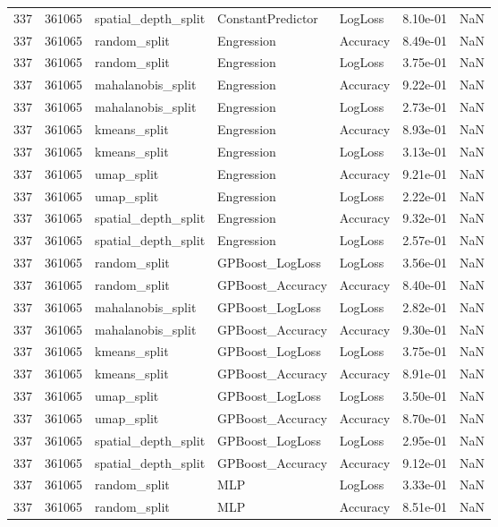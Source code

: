 \begin{tabular}{rrlllrr}
337 & 361065 & spatial\_depth\_split & ConstantPredictor & LogLoss & 8.10e-01 & NaN \\
337 & 361065 & random\_split & Engression & Accuracy & 8.49e-01 & NaN \\
337 & 361065 & random\_split & Engression & LogLoss & 3.75e-01 & NaN \\
337 & 361065 & mahalanobis\_split & Engression & Accuracy & 9.22e-01 & NaN \\
337 & 361065 & mahalanobis\_split & Engression & LogLoss & 2.73e-01 & NaN \\
337 & 361065 & kmeans\_split & Engression & Accuracy & 8.93e-01 & NaN \\
337 & 361065 & kmeans\_split & Engression & LogLoss & 3.13e-01 & NaN \\
337 & 361065 & umap\_split & Engression & Accuracy & 9.21e-01 & NaN \\
337 & 361065 & umap\_split & Engression & LogLoss & 2.22e-01 & NaN \\
337 & 361065 & spatial\_depth\_split & Engression & Accuracy & 9.32e-01 & NaN \\
337 & 361065 & spatial\_depth\_split & Engression & LogLoss & 2.57e-01 & NaN \\
337 & 361065 & random\_split & GPBoost\_LogLoss & LogLoss & 3.56e-01 & NaN \\
337 & 361065 & random\_split & GPBoost\_Accuracy & Accuracy & 8.40e-01 & NaN \\
337 & 361065 & mahalanobis\_split & GPBoost\_LogLoss & LogLoss & 2.82e-01 & NaN \\
337 & 361065 & mahalanobis\_split & GPBoost\_Accuracy & Accuracy & 9.30e-01 & NaN \\
337 & 361065 & kmeans\_split & GPBoost\_LogLoss & LogLoss & 3.75e-01 & NaN \\
337 & 361065 & kmeans\_split & GPBoost\_Accuracy & Accuracy & 8.91e-01 & NaN \\
337 & 361065 & umap\_split & GPBoost\_LogLoss & LogLoss & 3.50e-01 & NaN \\
337 & 361065 & umap\_split & GPBoost\_Accuracy & Accuracy & 8.70e-01 & NaN \\
337 & 361065 & spatial\_depth\_split & GPBoost\_LogLoss & LogLoss & 2.95e-01 & NaN \\
337 & 361065 & spatial\_depth\_split & GPBoost\_Accuracy & Accuracy & 9.12e-01 & NaN \\
337 & 361065 & random\_split & MLP & LogLoss & 3.33e-01 & NaN \\
337 & 361065 & random\_split & MLP & Accuracy & 8.51e-01 & NaN \\

\end{tabular}

